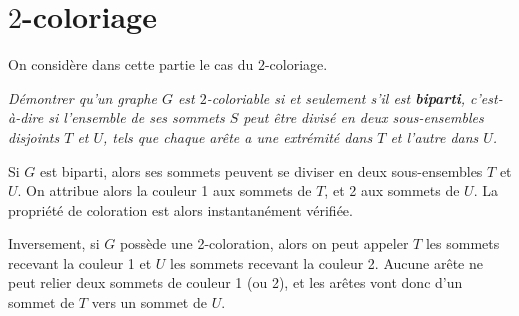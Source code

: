 \section{$2$-coloriage}
On considère dans cette partie le cas du $2$-coloriage. 
\begin{Exercise}\it 
Démontrer qu'un graphe $G$ est $2$-coloriable si et seulement s'il est {\bf biparti}, c'est-à-dire si l'ensemble de ses sommets $S$ peut être divisé en deux sous-ensembles disjoints $T$ et $U$, tels que chaque arête a une extrémité dans $T$ et l'autre dans $U$.
\end{Exercise} 
\begin{Answer}
Si $G$ est biparti, alors ses sommets peuvent se diviser en deux sous-ensembles $T$ et $U$. On attribue alors la couleur 1 aux sommets de $T$, et 2 aux sommets de $U$. La propriété de coloration est alors instantanément vérifiée.

Inversement, si $G$ possède une 2-coloration, alors on peut appeler $T$ les sommets recevant la couleur 1 et $U$ les sommets recevant la couleur 2. Aucune arête ne peut relier deux sommets de couleur 1 (ou 2), et les arêtes vont donc d'un sommet de $T$ vers un sommet de $U$. 
\end{Answer}

\medskip

